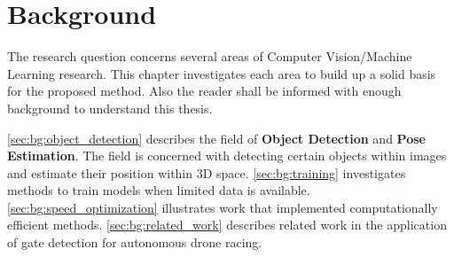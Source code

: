 \chapter{Background}
\label{sec:background}
	The research question concerns several areas of Computer Vision/Machine Learning research. This chapter investigates each area to build up a solid basis for the proposed method. Also the reader shall be informed with enough background to understand this thesis.
	
	\autoref{sec:bg:object_detection} describes the field of \textbf{Object Detection} and \textbf{Pose Estimation}. The field is concerned with detecting certain objects within images and estimate their position within 3D space. \autoref{sec:bg:training} investigates methods to train models when limited data is available. \autoref{sec:bg:speed_optimization} illustrates work that implemented computationally efficient methods. \autoref{sec:bg:related_work} describes related work in the application of gate detection for autonomous drone racing.




